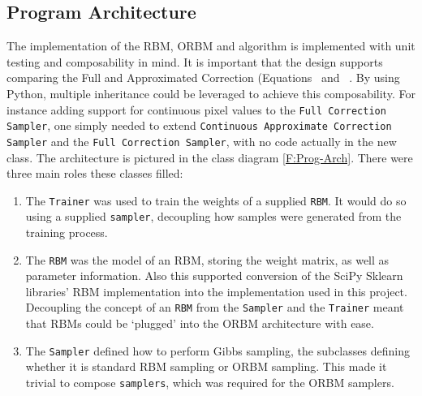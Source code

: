 \subsection{Program Architecture}

The implementation of the RBM, ORBM and algorithm is implemented with unit testing and composability in mind. It is important that the design supports comparing the Full and Approximated Correction (Equations~\cite{eq:Full-Corretion} and ~\cite{eq:Approx-Correction}. By using Python, multiple inheritance could be leveraged to achieve this composability. For instance adding support for continuous pixel values to the \texttt{Full Correction Sampler}, one simply needed to extend \texttt{Continuous Approximate Correction Sampler} and the \texttt{Full Correction Sampler}, with no code actually in the new class. The architecture is pictured in the class diagram \ref{F:Prog-Arch}. There were three main roles these classes filled:
\begin{enumerate}
  \item The \texttt{Trainer} was used to train the weights of a supplied \texttt{RBM}. It would do so using a supplied \texttt{sampler}, decoupling how samples were generated from the training process.
  \item The \texttt{RBM} was the model of an RBM, storing the weight matrix, as well as parameter information. Also this supported conversion of the SciPy Sklearn libraries' RBM implementation into the implementation used in this project. Decoupling the concept of an \texttt{RBM} from the \texttt{Sampler} and the \texttt{Trainer} meant that RBMs could be `plugged' into the ORBM architecture with ease.
  \item The \texttt{Sampler} defined how to perform Gibbs sampling, the subclasses defining whether it is standard RBM sampling or ORBM sampling. This made it trivial to compose \texttt{samplers}, which was required for the ORBM samplers.
\end{enumerate}

